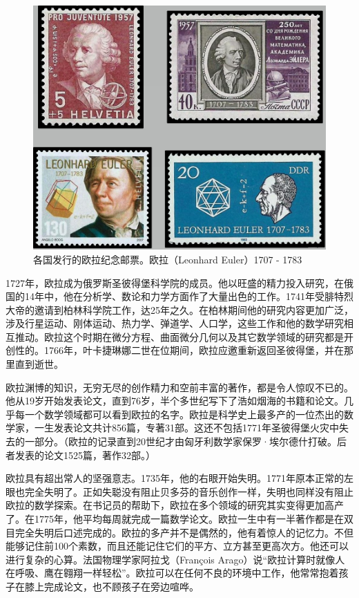 \documentclass[b5paper]{ctexart}
\begin{document}
\begin{figure}[htbp]
 \centering
 \includegraphics[scale=0.4]{img/euler.jpg}
 \captionsetup{labelformat=empty}
 \caption{各国发行的欧拉纪念邮票。欧拉（Leonhard Euler）1707 - 1783}
 \label{fig:Leonhard-Euler}
\end{figure}

1727年，欧拉成为俄罗斯圣彼得堡科学院的成员。他以旺盛的精力投入研究，在俄国的14年中，他在分析学、数论和力学方面作了大量出色的工作。1741年受腓特烈大帝的邀请到柏林科学院工作，达25年之久。在柏林期间他的研究内容更加广泛，涉及行星运动、刚体运动、热力学、弹道学、人口学，这些工作和他的数学研究相互推动。欧拉这个时期在微分方程、曲面微分几何以及其它数学领域的研究都是开创性的。1766年，叶卡捷琳娜二世在位期间，欧拉应邀重新返回圣彼得堡，并在那里直到逝世。

欧拉渊博的知识，无穷无尽的创作精力和空前丰富的著作，都是令人惊叹不已的。他从19岁开始发表论文，直到76岁，半个多世纪写下了浩如烟海的书籍和论文。几乎每一个数学领域都可以看到欧拉的名字。欧拉是科学史上最多产的一位杰出的数学家，一生发表论文共计856篇，专著31部。这还不包括1771年圣彼得堡火灾中失去的一部分。（欧拉的记录直到20世纪才由匈牙利数学家保罗·埃尔德什打破。后者发表的论文1525篇，著作32部。\cite{Wiki-Euler}）

欧拉具有超出常人的坚强意志。1735年，他的右眼开始失明。1771年原本正常的左眼也完全失明了。正如失聪没有阻止贝多芬的音乐创作一样，失明也同样没有阻止欧拉的数学探索\cite{HanXueTao2009}。在书记员的帮助下，欧拉在多个领域的研究其实变得更加高产了。在1775年，他平均每周就完成一篇数学论文。欧拉一生中有一半著作都是在双目完全失明后口述完成的。欧拉的多产并不是偶然的，他有着惊人的记忆力。不但能够记住前100个素数，而且还能记住它们的平方、立方甚至更高次方。他还可以进行复杂的心算。法国物理学家阿拉戈（François Arago）说“欧拉计算时就像人在呼吸、鹰在翱翔一样轻松”。欧拉可以在任何不良的环境中工作，他常常抱着孩子在膝上完成论文，也不顾孩子在旁边喧哗。
\end{document}
